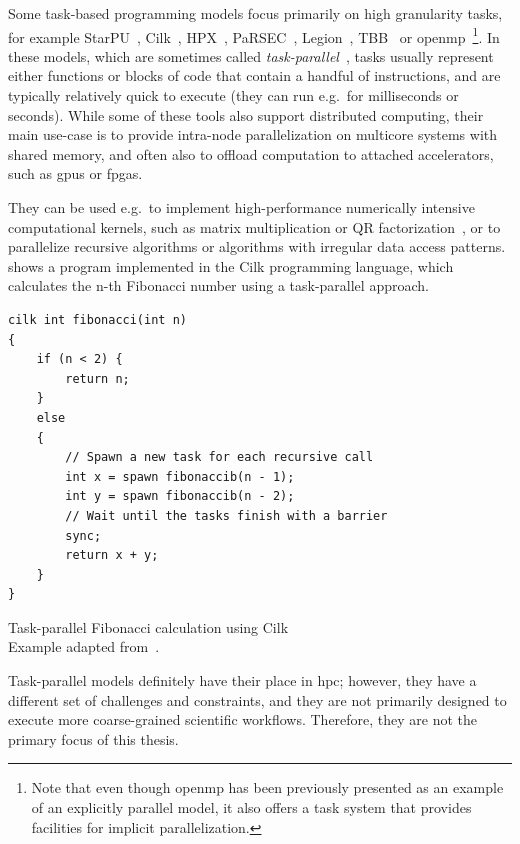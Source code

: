 Some task-based programming models focus primarily on high granularity tasks, for example
StarPU~\cite{starpu}, Cilk~\cite{cilk}, HPX~\cite{hpx},
PaRSEC~\cite{parsec}, Legion~\cite{legion}, TBB~\cite{tbb} or
\gls{openmp}~\cite{openmp}\footnote{Note that even though \gls{openmp} has been previously presented as an example of an
explicitly parallel model, it also offers a task system that provides facilities for implicit parallelization.}. In these models, which are
sometimes called \emph{task-parallel}~\cite{task_based_taxonomy}, tasks usually represent either
functions or blocks of code that contain a handful of instructions, and are typically relatively
quick to execute (they can run e.g.\ for milliseconds or seconds). While some of these tools also
support distributed computing, their main use-case is to provide intra-node parallelization on
multicore systems with shared memory, and often also to offload computation to attached
accelerators, such as \glspl{gpu} or \glspl{fpga}.

They can be used e.g.\ to implement high-performance numerically intensive computational kernels,
such as matrix multiplication or QR factorization~\cite{qr_factorization}, or to parallelize
recursive algorithms or algorithms with irregular data access patterns. 
shows a program implemented in the Cilk programming language, which calculates the n-th Fibonacci
number using a task-parallel approach.

\begin{listing}
	\begin{verbatim}
cilk int fibonacci(int n)
{
	if (n < 2) {
		return n;
	}
	else
	{
		// Spawn a new task for each recursive call
		int x = spawn fibonaccib(n - 1);
		int y = spawn fibonaccib(n - 2);
		// Wait until the tasks finish with a barrier
		sync;
		return x + y;
	}
}
	\end{verbatim}
	\caption{Task-parallel Fibonacci calculation using Cilk\\Example adapted from~\cite{cilk}.}
	\label{lst:cilk-fibonacci}
\end{listing}

Task-parallel models definitely have their place in \gls{hpc}; however, they have a
different set of challenges and constraints, and they are not primarily designed to execute more
coarse-grained scientific workflows. Therefore, they are not the primary focus of this thesis.

